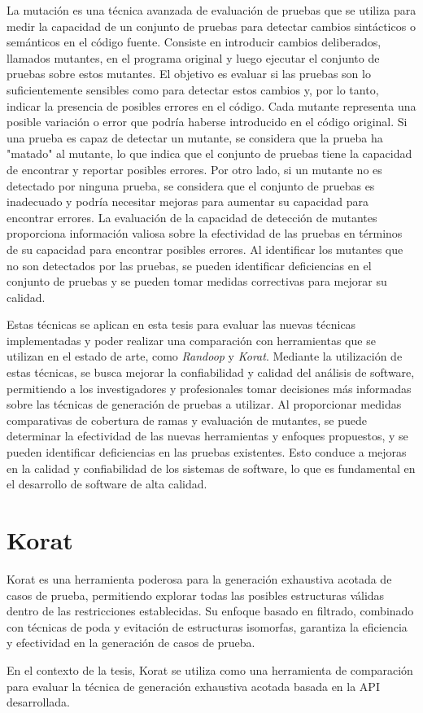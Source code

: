La mutación es una técnica avanzada de evaluación de pruebas que se utiliza para medir la capacidad de un conjunto de pruebas para detectar cambios sintácticos o semánticos en el código fuente. Consiste en introducir cambios deliberados, llamados mutantes, en el programa original y luego ejecutar el conjunto de pruebas sobre estos mutantes. El objetivo es evaluar si las pruebas son lo suficientemente sensibles como para detectar estos cambios y, por lo tanto, indicar la presencia de posibles errores en el código.
Cada mutante representa una posible variación o error que podría haberse introducido en el código original. Si una prueba es capaz de detectar un mutante, se considera que la prueba ha "matado" al mutante, lo que indica que el conjunto de pruebas tiene la capacidad de encontrar y reportar posibles errores. Por otro lado, si un mutante no es detectado por ninguna prueba, se considera que el conjunto de pruebas es inadecuado y podría necesitar mejoras para aumentar su capacidad para encontrar errores.
La evaluación de la capacidad de detección de mutantes proporciona información valiosa sobre la efectividad de las pruebas en términos de su capacidad para encontrar posibles errores. Al identificar los mutantes que no son detectados por las pruebas, se pueden identificar deficiencias en el conjunto de pruebas y se pueden tomar medidas correctivas para mejorar su calidad.

Estas técnicas se aplican en esta tesis para evaluar las nuevas técnicas implementadas y poder realizar una comparación con herramientas que se utilizan en el estado de arte, como \emph{Randoop} y \emph{Korat}. Mediante la utilización de estas técnicas, se busca mejorar la confiabilidad y calidad del análisis de software, permitiendo a los investigadores y profesionales tomar decisiones más informadas sobre las técnicas de generación de pruebas a utilizar. Al proporcionar medidas comparativas de cobertura de ramas y evaluación de mutantes, se puede determinar la efectividad de las nuevas herramientas y enfoques propuestos, y se pueden identificar deficiencias en las pruebas existentes. Esto conduce a mejoras en la calidad y confiabilidad de los sistemas de software, lo que es fundamental en el desarrollo de software de alta calidad.

\section{Korat}
Korat es una herramienta poderosa para la generación exhaustiva acotada de casos de prueba, permitiendo explorar todas las posibles estructuras válidas dentro de las restricciones establecidas. Su enfoque basado en filtrado, combinado con técnicas de poda y evitación de estructuras isomorfas, garantiza la eficiencia y efectividad en la generación de casos de prueba. 



En el contexto de la tesis, Korat se utiliza como una herramienta de comparación para evaluar la técnica de generación exhaustiva acotada basada en la API desarrollada.
